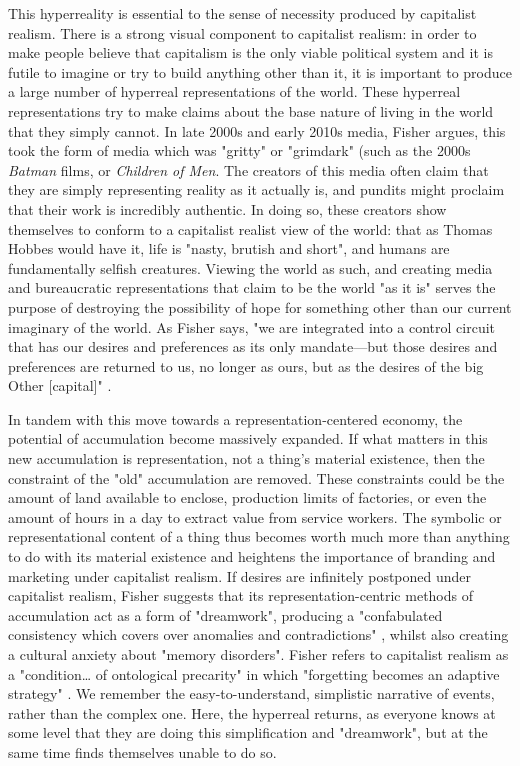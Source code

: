 This hyperreality is essential to the sense of necessity produced by capitalist realism. There is a strong visual component to capitalist realism: in order to make people believe that capitalism is the only viable political system and it is futile to imagine or try to build anything other than it, it is important to produce a large number of hyperreal representations of the world. These hyperreal representations try to make claims about the base nature of living in the world that they simply cannot. In late 2000s and early 2010s media, Fisher argues, this took the form of media which was "gritty" or "grimdark" (such as the 2000s \textit{Batman} films, or \emph{Children of Men}. The creators of this media often claim that they are simply representing reality as it actually is, and pundits might proclaim that their work is incredibly authentic. In doing so, these creators show themselves to conform to a capitalist realist view of the world: that as Thomas Hobbes would have it, life is "nasty, brutish and short", and humans are fundamentally selfish creatures. Viewing the world as such, and creating media and bureaucratic representations that claim to be the world "as it is" serves the purpose of destroying the possibility of hope for something other than our current imaginary of the world. As Fisher says, "we are integrated into a control circuit that has our desires and preferences as its only mandate—but those desires and preferences are returned to us, no longer as ours, but as the desires of the big Other [capital]" \citeyearpar[p. 53]{fisher_capitalist_2009}.

In tandem with this move towards a representation-centered economy, the potential  of accumulation become massively expanded. If what matters in this new accumulation is representation, not a thing's material existence, then the constraint of the "old" accumulation are removed. These constraints could be the amount of land available to enclose, production limits of factories, or even the amount of hours in a day to extract value from service workers. The symbolic or representational content of a thing thus becomes worth much more than anything to do with its material existence and heightens the importance of branding and marketing under capitalist realism. If desires are infinitely postponed under capitalist realism, Fisher suggests that its representation-centric methods of accumulation act as a form of "dreamwork", producing a "confabulated consistency which covers over anomalies and contradictions" \citep[p. 64]{fisher_capitalist_2009}, whilst also creating a cultural anxiety about "memory disorders". Fisher refers to capitalist realism as a "condition\ldots{} of ontological precarity" in which "forgetting becomes an adaptive strategy" \citep[p. 60]{fisher_capitalist_2009}. We remember the easy-to-understand, simplistic narrative of events, rather than the complex one.  Here, the hyperreal returns, as everyone knows at some level that they are doing this simplification and "dreamwork", but at the same time finds themselves unable to do so.

